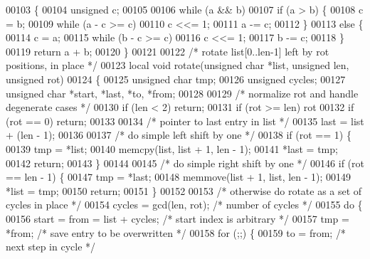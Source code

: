 \begin{DoxyCode}
{00103 \{
00104     \textcolor{keywordtype}{unsigned} c;
00105 
00106     \textcolor{keywordflow}{while} (a && b)
00107         \textcolor{keywordflow}{if} (a > b) \{
00108             c = b;
00109             \textcolor{keywordflow}{while} (a - c >= c)
00110                 c <<= 1;
00111             a -= c;
00112         \}
00113         \textcolor{keywordflow}{else} \{
00114             c = a;
00115             \textcolor{keywordflow}{while} (b - c >= c)
00116                 c <<= 1;
00117             b -= c;
00118         \}
00119     \textcolor{keywordflow}{return} a + b;
00120 \}
00121 
00122 \textcolor{comment}{/* rotate list[0..len-1] left by rot positions, in place */}
00123 local \textcolor{keywordtype}{void} rotate(\textcolor{keywordtype}{unsigned} \textcolor{keywordtype}{char} *list, \textcolor{keywordtype}{unsigned} len, \textcolor{keywordtype}{unsigned} rot)
00124 \{
00125     \textcolor{keywordtype}{unsigned} \textcolor{keywordtype}{char} tmp;
00126     \textcolor{keywordtype}{unsigned} cycles;
00127     \textcolor{keywordtype}{unsigned} \textcolor{keywordtype}{char} *start, *last, *to, *from;
00128 
00129     \textcolor{comment}{/* normalize rot and handle degenerate cases */}
00130     \textcolor{keywordflow}{if} (len < 2) \textcolor{keywordflow}{return};
00131     \textcolor{keywordflow}{if} (rot >= len) rot %
00132     \textcolor{keywordflow}{if} (rot == 0) \textcolor{keywordflow}{return};
00133 
00134     \textcolor{comment}{/* pointer to last entry in list */}
00135     last = list + (len - 1);
00136 
00137     \textcolor{comment}{/* do simple left shift by one */}
00138     \textcolor{keywordflow}{if} (rot == 1) \{
00139         tmp = *list;
00140         memcpy(list, list + 1, len - 1);
00141         *last = tmp;
00142         \textcolor{keywordflow}{return};
00143     \}
00144 
00145     \textcolor{comment}{/* do simple right shift by one */}
00146     \textcolor{keywordflow}{if} (rot == len - 1) \{
00147         tmp = *last;
00148         memmove(list + 1, list, len - 1);
00149         *list = tmp;
00150         \textcolor{keywordflow}{return};
00151     \}
00152 
00153     \textcolor{comment}{/* otherwise do rotate as a set of cycles in place */}
00154     cycles = gcd(len, rot);             \textcolor{comment}{/* number of cycles */}
00155     \textcolor{keywordflow}{do} \{
00156         start = from = list + cycles;   \textcolor{comment}{/* start index is arbitrary */}
00157         tmp = *from;                    \textcolor{comment}{/* save entry to be overwritten */}
00158         \textcolor{keywordflow}{for} (;;) \{
00159             to = from;                  \textcolor{comment}{/* next step in cycle */}
}
\end{DoxyCode}
